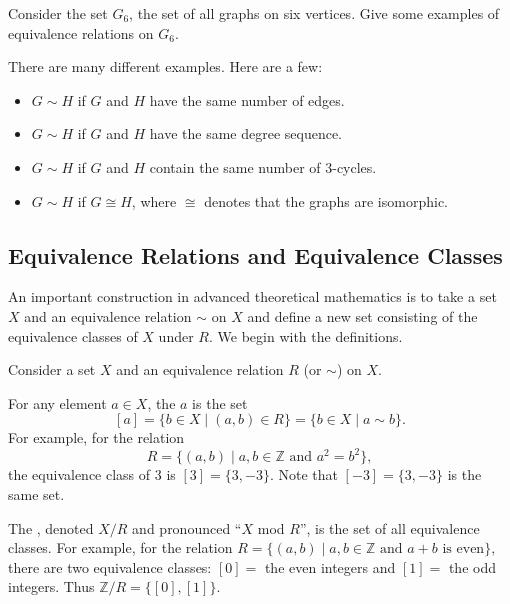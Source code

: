 \begin{exam}
\label{exam_equiv_rel_graphs}
    Consider the set $G_6$, the set of all graphs on six vertices.  Give some examples of equivalence relations on $G_6$.
        \begin{soln}
            There are many different examples. Here are a few:
                \begin{itemize}
                    \item $G \sim H$ if $G$ and $H$ have the same number of edges.  
                    \item $G \sim H$ if $G$ and $H$ have the same degree sequence.
                    \item $G \sim H$ if $G$ and $H$ contain the same number of 3-cycles. 
                    \item $G \sim H$ if $G \cong H$, where $\cong$ denotes that the graphs are isomorphic.
                \end{itemize}
        \end{soln}
\end{exam}


\newcommand{\subequivclass}{Equivalence Relations and Equivalence Classes}
\subsection{\subequivclass}
\label{sub_equiv_classes}

An important construction in advanced theoretical mathematics is to take a set $X$ and an equivalence relation $\sim$ on $X$ and define a new set consisting of the equivalence classes of $X$ under $R$.  We begin with the definitions.

\begin{defn}
\label{defn_equiv_class}
    Consider a set $X$ and an equivalence relation $R$ (or $\sim$) on $X$.
        \begin{apart}
            \item For any element $a \in X$, the  $a$ is the set 
                $$[a]=\{b \in X \mid (a,b) \in R\} = \{b \in X \mid a \sim b\}.$$
            For example, for the relation $$R=\{ (a,b) \mid a, b\in \mathbb{Z} \text{ and } a^2 =b^2 \},$$
            the equivalence class of $3$ is $[3] = \{3,-3\}$.  Note that $[-3]=\{3,-3\}$ is the same set.

            \item The , denoted $X/R$ and pronounced ``$X$ mod $R$'', is the set of all equivalence classes.  For example, for the relation $R = \{(a,b) \mid a, b\in \mathbb{Z} \text{ and } a+b \text{ is even}\},$
            there are two equivalence classes: $[0]=$ the even integers and $[1]=$ the odd integers.  Thus $\mathbb{Z}/R = \{[0],[1]\}$.  
        \end{apart}
\end{defn}

